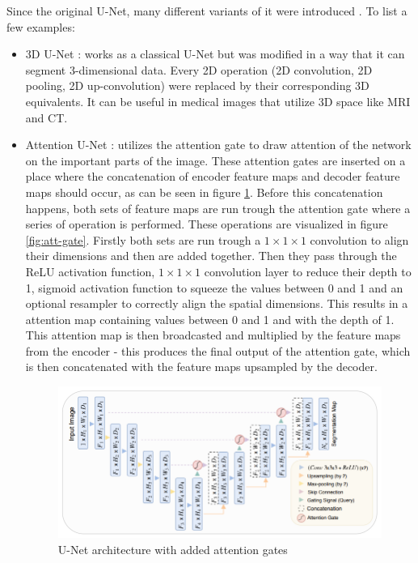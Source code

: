 Since the original U-Net, many different variants of it were introduced \cite{Siddique2021}. To list a few examples:

\begin{itemize}
    \item 3D U-Net \cite{Çiçek2016}: works as a classical U-Net but was modified in a way that it can segment 3-dimensional data. Every 2D operation (2D convolution, 2D pooling, 2D up-convolution) were replaced by their corresponding  3D equivalents. It can be useful in medical images that utilize 3D space like MRI and CT.
    \item Attention U-Net \cite{Oktay2018}: utilizes the attention gate to draw attention of the network on the important parts of the image. These attention gates are inserted on a place where the concatenation of encoder feature maps and decoder feature maps should occur, as can be seen in figure \ref{fig:att-unet}. Before this concatenation happens, both sets of feature maps are run trough the attention gate where a series of operation is performed. These operations are visualized in figure \ref{fig:att-gate}. Firstly both sets are run trough a $1\!\times\!1\!\times\!1$ convolution to align their dimensions and then are added together. Then they pass through the ReLU activation function, $1\!\times\!1\!\times\!1$ convolution layer to reduce their depth to 1, sigmoid activation function to squeeze the values between 0 and 1 and an optional resampler to correctly align the spatial dimensions. This results in a attention map containing values between 0 and 1 and with the depth of 1. This attention map is then broadcasted and multiplied by the feature maps from the encoder - this produces the final output of the attention gate, which is then concatenated with the feature maps upsampled by the decoder.

    \begin{figure}[H]
    \begin{centering}
    \includegraphics[width=12cm]{assets/images/att-unet.png}
    \par\end{centering}
    \caption{U-Net architecture with added attention gates \cite{Oktay2018}}
    \label{fig:att-unet}
    \end{figure}


\end{itemize}
